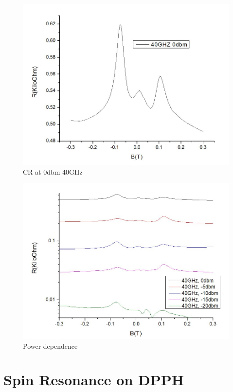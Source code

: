 \documentclass[12pt]{ruthesis}
\begin{document}
\begin{figure}
  \centering
  \includegraphics[scale=0.5]{figures/0dbm.JPG}
  \caption{CR at 0dbm 40GHz}
  \label{0dbm_40ghz}
\end{figure}
 
 
\begin{figure}
  \centering
  \includegraphics[scale=0.5]{figures/thermopowerdep.JPG}
  \caption{Power dependence}
  \label{thermopowerdep}
\end{figure}
 






\section{Spin Resonance on DPPH}\label{DPPH}
\end{document}
